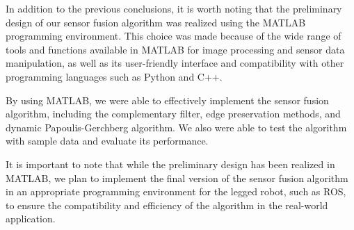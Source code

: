 \documentclass[12pt]{article}
\begin{document}
In addition to the previous conclusions, it is worth noting that the preliminary design of our sensor fusion algorithm was realized using the MATLAB programming environment. This choice was made because of the wide range of tools and functions available in MATLAB for image processing and sensor data manipulation, as well as its user-friendly interface and compatibility with other programming languages such as Python and C++.

By using MATLAB, we were able to effectively implement the sensor fusion algorithm, including the complementary filter, edge preservation methods, and dynamic Papoulis-Gerchberg algorithm. We also were able to test the algorithm with sample data and evaluate its performance.

It is important to note that while the preliminary design has been realized in MATLAB, we plan to implement the final version of the sensor fusion algorithm in an appropriate programming environment for the legged robot, such as ROS, to ensure the compatibility and efficiency of the algorithm in the real-world application.



\end{document}

